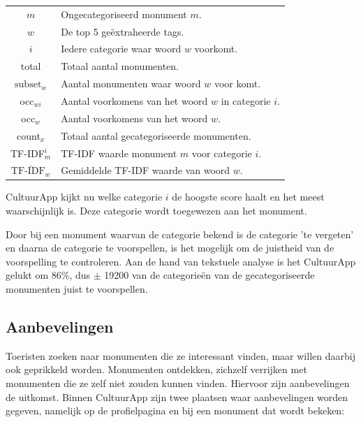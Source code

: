 \documentclass[a4paper,10pt]{article}
\begin{document}
	\begin{center}
			\begin{tabular}{ c | l }
				$m$ & Ongecategoriseerd monument $m$.\\
				$w$ & De top 5 ge\"extraheerde tags.\\
				$i$ & Iedere categorie waar woord $w$ voorkomt.\\
				total & Totaal aantal monumenten.\\
				$\text{subset}_w$ & Aantal monumenten waar woord $w$ voor komt.\\
				occ$_{wi}$ & Aantal voorkomens van het woord $w$ in categorie $i$. \\
			  	occ$_{w}$ & Aantal voorkomens van het woord $w$.\\
				count$_x$ & Totaal aantal gecategoriseerde monumenten.\\
				TF-IDF$_m^i$ & TF-IDF waarde monument $m$ voor categorie $i$.\\
			$\overline{\text{TF-IDF}_w}$ & Gemiddelde TF-IDF waarde van woord $w$.
		
			
			\end{tabular}
		\end{center}
	
	\noindent CultuurApp kijkt nu welke categorie $i$ de hoogste score haalt en het meest waarschijnlijk is. Deze categorie wordt toegewezen aan het monument.
	
	Door bij een monument waarvan de categorie bekend is de categorie 'te vergeten' en daarna de categorie te voorspellen, is het mogelijk om de juistheid van de voorspelling te controleren. Aan de hand van tekstuele analyse is het CultuurApp gelukt om 86\%, dus $\pm$ 19200 van de categorie\"en van de gecategoriseerde monumenten juist te voorspellen.
		
	\subsection{Aanbevelingen}
	Toeristen zoeken naar monumenten die ze interessant vinden, maar willen daarbij ook geprikkeld worden. Monumenten ontdekken, zichzelf verrijken met monumenten die ze zelf niet zouden kunnen vinden. Hiervoor zijn aanbevelingen de uitkomst. Binnen CultuurApp zijn twee plaatsen waar aanbevelingen worden gegeven, namelijk op de profielpagina en bij een monument dat wordt bekeken:
	
\end{document}
